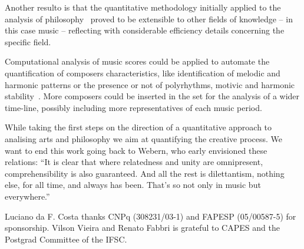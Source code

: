 \documentclass[
 aip,
 jmp,
 amsmath,amssymb,
 reprint,
]{revtex4-1}
\begin{document}
Another resulto is that the quantitative methodology initially applied to the analysis of philosophy~\cite{Fabbri}
proved to be extensible to other fields of knowledge -- in this case music --
reflecting with considerable efficiency details concerning the specific field. 

Computational analysis of music scores could be
applied to automate the quantification of composers characteristics, like
identification of melodic and harmonic patterns or the presence or not of
polyrhythms, motivic and harmonic stability~\cite{Correa}. More composers could be
inserted in the set for the analysis of a wider time-line, possibly
including more representatives of each music period.

While taking the first
steps on the direction of a quantitative approach to analising arts and philosophy
we aim at quantifying the creative process. We want to end this work going back to Webern,
who early envisioned these relations: ``It is clear that where relatedness and unity are omnipresent,
comprehensibility is also guaranteed. And all the rest is
dilettantism, nothing else, for all time, and always has been. That's
so not only in music but everywhere.''

\begin{acknowledgments}
Luciano da F. Costa thanks CNPq (308231/03-1) and FAPESP (05/00587-5)
for sponsorship. Vilson Vieira and Renato Fabbri is grateful to CAPES and 
the Postgrad Committee of the IFSC.
\end{acknowledgments}

\nocite{*}

\end{document}
